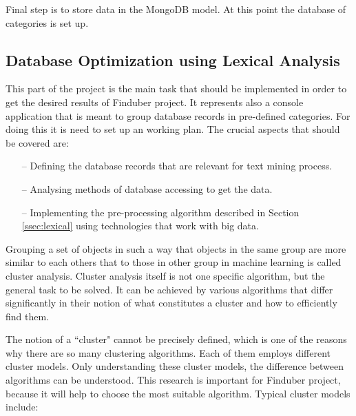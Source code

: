 Final step is to store data in the MongoDB model. At this point the database of categories is set up. 

\subsection{Database Optimization using Lexical Analysis}

This part of the project is the main task that should be implemented in order to get the desired results of Finduber project. It represents also a console application that is meant to group database records in pre-defined categories. For doing this it is need to set up an working plan. The crucial aspects that should be covered are: 

\begin{itemize}
\item[--] Defining the database records that are relevant for text mining process.

\item[--] Analysing methods of database accessing to get the data.

\item[--] Implementing the pre-processing algorithm described in Section \ref{ssec:lexical} using technologies that work with big data.
\end{itemize}

Grouping a set of objects in such a way that objects in the same group are more similar to each others that to those in other group in machine learning is called cluster analysis. Cluster analysis itself is not one specific algorithm, but the general task to be solved. It can be achieved by various algorithms that differ significantly in their notion of what constitutes a cluster and how to efficiently find them.

The notion of a ``cluster" cannot be precisely defined, which is one of the reasons why there are so many clustering algorithms. Each of them employs different cluster models. Only understanding these cluster models, the difference between algorithms can be understood. This research is important for Finduber project, because it will help to choose the most suitable algorithm. Typical cluster models include:


